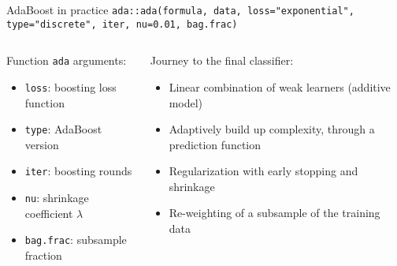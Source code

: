 \begin{frame}{AdaBoost in practice}
\vspace*{-2.5em}\lstinline|ada::ada(formula, data, loss="exponential", type="discrete", iter, nu=0.01, bag.frac)|\bigskip\smallskip

\begin{columns}[T]
\begin{column}{0.5\textwidth}
Function \texttt{ada} arguments:
{\small\begin{itemize}
	\setlength{\itemsep}{-0.8ex}
	\item \texttt{loss}: boosting loss function
	\item \texttt{type}: AdaBoost version
	\item \texttt{iter}: boosting rounds
	\item \texttt{nu}: shrinkage coefficient $\lambda$
	\item \texttt{bag.frac}: subsample fraction
\end{itemize}}
\end{column}
\begin{column}{0.5\textwidth}
	Journey to the final classifier:
	{\small\begin{itemize}
	\setlength{\itemsep}{-0.8ex}
	\item Linear combination of \alert{weak learners} (additive model)
	\item Adaptively build up complexity, through a prediction function
	\item Regularization with early stopping and shrinkage
	\item \alert{Re-weighting} of a subsample of the training data  %
	\end{itemize}}
\end{column}
\end{columns}

\end{frame}




%

